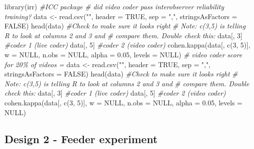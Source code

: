 \documentclass[
]{article}
\newenvironment{Shaded}{\begin{snugshade}}{\end{snugshade}}
\newcommand{\AttributeTok}[1]{\textcolor[rgb]{0.77,0.63,0.00}{#1}}
\newcommand{\CommentTok}[1]{\textcolor[rgb]{0.56,0.35,0.01}{\textit{#1}}}
\newcommand{\ConstantTok}[1]{\textcolor[rgb]{0.00,0.00,0.00}{#1}}
\newcommand{\DecValTok}[1]{\textcolor[rgb]{0.00,0.00,0.81}{#1}}
\newcommand{\FloatTok}[1]{\textcolor[rgb]{0.00,0.00,0.81}{#1}}
\newcommand{\FunctionTok}[1]{\textcolor[rgb]{0.00,0.00,0.00}{#1}}
\newcommand{\NormalTok}[1]{#1}
\newcommand{\OtherTok}[1]{\textcolor[rgb]{0.56,0.35,0.01}{#1}}
\newcommand{\StringTok}[1]{\textcolor[rgb]{0.31,0.60,0.02}{#1}}
\begin{document}
\begin{Shaded}
\begin{Highlighting}[]
\FunctionTok{library}\NormalTok{(irr)  }\CommentTok{\#ICC package}
\CommentTok{\# did video coder pass interobserver reliability training?}
\NormalTok{data }\OtherTok{\textless{}{-}} \FunctionTok{read.csv}\NormalTok{(}\StringTok{""}\NormalTok{, }\AttributeTok{header =} \ConstantTok{TRUE}\NormalTok{, }\AttributeTok{sep =} \StringTok{","}\NormalTok{, }\AttributeTok{stringsAsFactors =} \ConstantTok{FALSE}\NormalTok{)}
\FunctionTok{head}\NormalTok{(data)  }\CommentTok{\#Check to make sure it looks right}
\CommentTok{\# Note: c(3,5) is telling R to look at columns 2 and 3 and}
\CommentTok{\# compare them. Double check this:}
\NormalTok{data[, }\DecValTok{3}\NormalTok{]  }\CommentTok{\#coder 1 (live coder)}
\NormalTok{data[, }\DecValTok{5}\NormalTok{]  }\CommentTok{\#coder 2 (video coder)}
\FunctionTok{cohen.kappa}\NormalTok{(data[, }\FunctionTok{c}\NormalTok{(}\DecValTok{3}\NormalTok{, }\DecValTok{5}\NormalTok{)], }\AttributeTok{w =} \ConstantTok{NULL}\NormalTok{, }\AttributeTok{n.obs =} \ConstantTok{NULL}\NormalTok{, }\AttributeTok{alpha =} \FloatTok{0.05}\NormalTok{,}
    \AttributeTok{levels =} \ConstantTok{NULL}\NormalTok{)}
\CommentTok{\# video coder score for 20\% of videos =}
\NormalTok{data }\OtherTok{\textless{}{-}} \FunctionTok{read.csv}\NormalTok{(}\StringTok{""}\NormalTok{, }\AttributeTok{header =} \ConstantTok{TRUE}\NormalTok{, }\AttributeTok{sep =} \StringTok{","}\NormalTok{, }\AttributeTok{stringsAsFactors =} \ConstantTok{FALSE}\NormalTok{)}
\FunctionTok{head}\NormalTok{(data)  }\CommentTok{\#Check to make sure it looks right}
\CommentTok{\# Note: c(3,5) is telling R to look at columns 2 and 3 and}
\CommentTok{\# compare them. Double check this:}
\NormalTok{data[, }\DecValTok{3}\NormalTok{]  }\CommentTok{\#coder 1 (live coder)}
\NormalTok{data[, }\DecValTok{5}\NormalTok{]  }\CommentTok{\#coder 2 (video coder)}
\FunctionTok{cohen.kappa}\NormalTok{(data[, }\FunctionTok{c}\NormalTok{(}\DecValTok{3}\NormalTok{, }\DecValTok{5}\NormalTok{)], }\AttributeTok{w =} \ConstantTok{NULL}\NormalTok{, }\AttributeTok{n.obs =} \ConstantTok{NULL}\NormalTok{, }\AttributeTok{alpha =} \FloatTok{0.05}\NormalTok{,}
    \AttributeTok{levels =} \ConstantTok{NULL}\NormalTok{)}
\end{Highlighting}
\end{Shaded}

\hypertarget{design-2---feeder-experiment}{%
\subsection{\texorpdfstring{\textbf{Design 2 - Feeder
experiment}}{Design 2 - Feeder experiment}}\label{design-2---feeder-experiment}}
\end{document}
